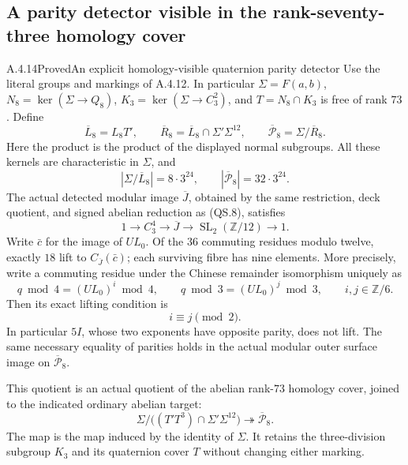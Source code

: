 \subsection{A parity detector visible in the rank-seventy-three homology cover}

\begin{result}{A.4.14}{Proved}{An explicit homology-visible quaternion parity detector}
Use the literal groups and markings of A.4.12.  In particular
$\Sigma=F(a,b)$, $N_8=\ker(\Sigma\to Q_8)$,
$K_3=\ker(\Sigma\to C_3^2)$, and $T=N_8\cap K_3$ is free
of rank $73$.  Define
\[
 \overline L_8=L_8T',\qquad
 \overline R_8=\overline L_8\cap\Sigma'\Sigma^{12},
 \qquad \overline{\mathcal P}_8=\Sigma/\overline R_8.
                                                        \tag{QH.1}
\]
Here the product is the product of the displayed normal
subgroups.  All these kernels are characteristic in
$\Sigma$, and
\[
 |\Sigma/\overline L_8|=8\cdot3^{24},\qquad
 |\overline{\mathcal P}_8|=32\cdot3^{24}.                \tag{QH.2}
\]
The actual detected modular image $\overline J$, obtained by
the same restriction, deck quotient, and signed abelian
reduction as (QS.8), satisfies
\[
 1\longrightarrow C_3^4\longrightarrow\overline J
 \longrightarrow\operatorname{SL}_2(\mathbb Z/12)
 \longrightarrow1.                                    \tag{QH.3}
\]
Write $\bar c$ for the image of $UL_0$.  Of the $36$
commuting residues modulo twelve, exactly $18$ lift to
$C_{\overline J}(\bar c)$; each surviving fibre has nine
elements.  More precisely, write a commuting residue under
the Chinese remainder isomorphism uniquely as
\[
 q\bmod4=(UL_0)^i\bmod4,\qquad
 q\bmod3=(UL_0)^j\bmod3,\qquad i,j\in\mathbb Z/6.
                                                        \tag{QH.4}
\]
Then its exact lifting condition is
\[
                         i\equiv j\pmod2.              \tag{QH.5}
\]
In particular $5I$, whose two exponents have opposite
parity, does not lift.  The same necessary equality of
parities holds in the actual modular outer surface image
on $\overline{\mathcal P}_8$.

This quotient is an actual quotient of the abelian
rank-$73$ homology cover, joined to the indicated ordinary
abelian target:
\[
 \Sigma/\bigl((T'T^3)\cap\Sigma'\Sigma^{12}\bigr)
              \twoheadrightarrow\overline{\mathcal P}_8.
                                                        \tag{QH.6}
\]
The map is the map induced by the identity of $\Sigma$.
It retains the three-division subgroup $K_3$ and its
quaternion cover $T$ without changing either marking.
\end{result}

